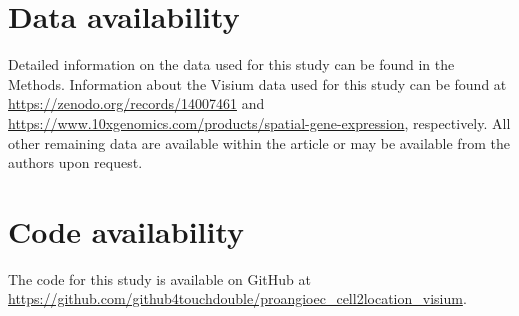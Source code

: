\documentclass[a4paper,12pt]{article}
\begin{document}
\section{Data availability}  
Detailed information on the data used for this study can be found in the Methods. Information about the Visium data used for this study can be found at \url{https://zenodo.org/records/14007461} and \url{https://www.10xgenomics.com/products/spatial-gene-expression}, respectively. All other remaining data are available within the article or may be available from the authors upon request.  

\section{Code availability}  
The code for this study is available on GitHub at \url{https://github.com/github4touchdouble/proangioec_cell2location_visium}.  



\end{document}
